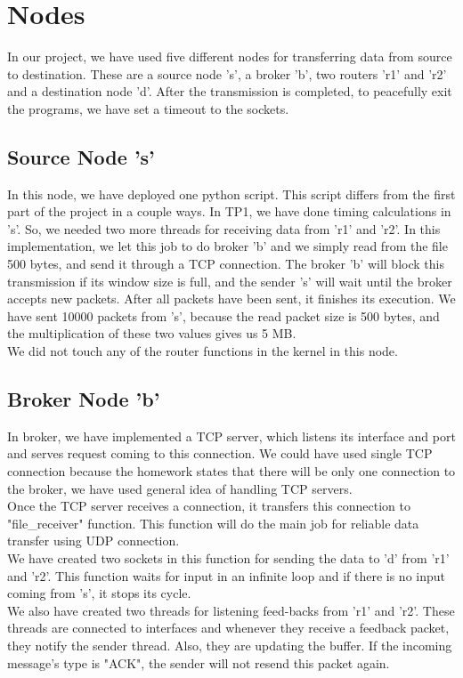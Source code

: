 \documentclass[12pt,journal,compsoc]{IEEEtran}
\begin{document}
\section{Nodes}
In our project, we have used five different nodes for transferring data from source to destination. These are a source node 's', a broker 'b', two routers 'r1' and 'r2' and a destination node 'd'. After the transmission is completed, to peacefully exit the programs, we have set a timeout to the sockets.\\
\subsection{Source Node 's'}
In this node, we have deployed one python script. This script differs from the first part of the project in a couple ways. In TP1, we have done timing calculations in 's'. So, we needed two more threads for receiving data from 'r1' and 'r2'. In this implementation, we let this job to do broker 'b' and we simply read from the file 500 bytes, and send it through a TCP connection. The broker 'b' will block this transmission if its window size is full, and the sender 's' will wait until the broker accepts new packets. After all packets have been sent, it finishes its execution. We have sent 10000 packets from 's', because the read packet size is 500 bytes, and the multiplication of these two values gives us 5 MB.\\
We did not touch any of the router functions in the kernel in this node.\\
\subsection{Broker Node 'b'}
In broker, we have implemented a TCP server, which listens its interface and port and serves request coming to this connection. We  could have used single TCP connection because the homework states that there will be only one connection to the broker, we have used general idea of handling TCP servers.\\
Once the TCP server receives a connection, it transfers this connection to "file\_receiver" function. This function will do the main job for reliable data transfer using UDP connection.\\
We have created two sockets in this function for sending the data to 'd' from 'r1' and 'r2'. This function waits for input in an infinite loop and if there is no input coming from 's', it stops its cycle.\\
We also have created two threads for listening feed-backs from 'r1' and 'r2'. These threads are connected to interfaces and whenever they receive a feedback packet, they notify the sender thread. Also, they are updating the buffer. If the incoming message's type is "ACK", the sender will not resend this packet again.\\
\end{document}
